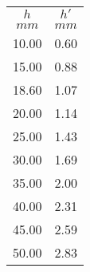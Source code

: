 \begin{table}[H]
\centering
\begin{tabular}{|c|c|}
\hline
    $h$ 	&	$h'$		\\
    $mm$	&	$mm$		\\
    \hline
    10.00	&	0.60		\\
    15.00	&	0.88		\\
    18.60	&	1.07		\\
    20.00	&	1.14		\\
    25.00	&	1.43		\\
    30.00	&	1.69		\\
    35.00	&	2.00		\\
    40.00	&	2.31		\\
    45.00	&	2.59		\\
    50.00	&	2.83		\\
\hline    
\end{tabular}
\end{table}